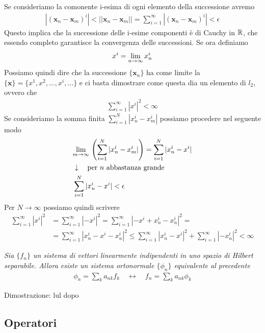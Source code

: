 Se consideriamo la comonente i-esima di ogni elemento della successione avremo
\begin{align}
	|(\mathbf{x}_n-\mathbf{x}_m)^i| < ||\mathbf{x}_n-\mathbf{x}_m|| = \sum_{i=1}^{\infty} |(\mathbf{x}_n-\mathbf{x}_m)^i|<\epsilon
\end{align}
Questo implica che la successione delle i-esime componenti è di Cauchy in $\mathbb{R}$, che essendo completo garantisce la convergenza delle successioni.
Se ora definiamo
\begin{align}
	x^i = \underset{n \rightarrow \infty}{\lim} \,x_n^i
\end{align}
Possiamo quindi dire che la successione  $\{\mathbf{x}_n\}$ ha come limite la $\{\mathbf{x}\} = \{ x^1,x^2 ,\dots, x^i,\dots \}$ e ci basta dimostrare come questa dia un elemento di $l_2$, ovvero che
\begin{align}
	\sum_{i=1}^{\infty} |x^i|^2 < \infty
\end{align}
Se consideriamo la somma finita $\sum_{i=1}^{N} |x_n^i - x_m^i|$ possiamo procedere nel seguente modo
\begin{align}
	&\underset{m \rightarrow \infty}{\lim} \,\left(\sum_{i=1}^{N} |x_n^i - x_m^i|\right) = \sum_{i=1}^{N} |x_n^i - x^i|\\ &\downarrow \quad \text{per $n$ abbastanza grande} \nonumber \\
	&\sum_{i=1}^{N} |x_n^i - x^i| < \epsilon
\end{align}
Per $N\to \infty$ possiamo quindi scrivere 
\begin{align}
	\sum_{i=1}^{\infty} |x^i|^2 &= \sum_{i=1}^{\infty} |-x^i|^2 = \sum_{i=1}^{\infty} |-x^i + x_n^i - x_n^i|^2 = \nonumber\\
	&= \sum_{i=1}^{\infty} | x_n^i -x^i - x_n^i|^2 \leq  \sum_{i=1}^{\infty} | x_n^i -x^i|^2 + \sum_{i=1}^{\infty}|- x_n^i|^2<\infty
\end{align}
	
\newpage


\textit{Sia $\{f_n\}$ un sistema di vettori linearmente indipendenti in uno spazio di Hilbert separabile. Allora esiste un sistema ortonormale $\{\phi_n\}$ equivalente al precedente}
\begin{align}
	\phi_n = \sum_{k} a_{nk} f_k \quad\leftrightarrow\quad f_n = \sum_{k} a_{nk} \phi_k
\end{align}

Dimostrazione: lul dopo

\newpage


\subsection{Operatori}

